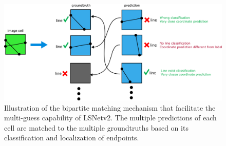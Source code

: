 \documentclass[journal]{IEEEtran}
\begin{document}
%


\begin{figure}[hbt!]
  \includegraphics[width=\linewidth]{imgs/others/bimatching.png}
  \caption{Illustration of the bipartite matching mechanism that facilitate the multi-guess capability of LSNetv2. The multiple predictions of each cell are matched to the multiple groundtruths based on its classification and localization of endpoints.}
  \label{bimatching}
\end{figure}
\end{document}
